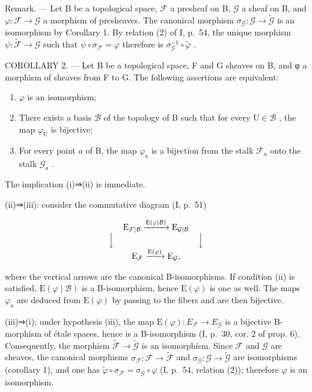 Remark. --- Let B be a topological space, \(\mathcal{F}\) a presheaf on B, \(\mathcal{G}\) a sheaf on B, and \(\varphi\colon\mathcal{F}\to\mathcal{G}\) a morphism of presheaves. The canonical morphism \(\sigma_{\mathcal{G}}\colon\mathcal{G}\to\widetilde{\mathcal{G}}\) is an isomorphism by Corollary 1. By relation (2) of I, p.~54, the unique morphism \(\psi\colon\widetilde{\mathcal{F}}\to\mathcal{G}\) such that \(\psi\circ\sigma_{\mathcal{F}}=\varphi\) therefore is \(\sigma_{\mathcal{G}}^{-1}\circ\widetilde{\varphi}\) .

COROLLARY 2. --- Let B be a topological space, F and G sheaves on B, and φ a morphism of sheaves from F to G. The following assertions are equivalent:

\begin{enumerate}
\def\labelenumi{(\roman{enumi})}
\item
  \(\varphi\) is an isomorphism;
\item
  There exists a basis \(\mathcal{B}\) of the topology of B such that for every \(\mathrm{U} \in \mathcal{B}\) , the map \(\varphi_{\mathrm{U}}\) is bijective;
\item
  For every point \(a\) of B, the map \(\varphi_{a}\) is a bijection from the stalk \(\mathcal{F}_{a}\) onto the stalk \(\mathcal{G}_{a}\) .
\end{enumerate}

The implication (i)⇒(ii) is immediate.

(ii)⇒(iii): consider the commutative diagram (I, p.~51)

\[
\begin{array}{c} \mathrm{E} _ {\mathcal {F} | \mathcal {B}} \xrightarrow {\mathrm{E} (\varphi | \mathcal {B})} \mathrm{E} _ {\mathcal {G} | \mathcal {B}} \\ \Big \downarrow \qquad \qquad \qquad \qquad \qquad \Big \downarrow \\ \mathrm{E} _ {\mathcal {F}} \xrightarrow {\mathrm{E} (\varphi)} \mathrm{E} _ {\mathcal {G}}, \end{array}
\]

where the vertical arrows are the canonical B-isomorphisms. If condition (ii) is satisfied, \(\mathrm{E}(\varphi \mid \mathcal{B})\) is a B-isomorphism, hence \(\mathrm{E}(\varphi)\) is one as well. The maps \(\varphi_{a}\) are deduced from \(\mathrm{E}(\varphi)\) by passing to the fibers and are then bijective.

(iii)⇒(i): under hypothesis (iii), the map \(\mathrm{E}(\varphi)\colon E_{\mathcal{F}} \to E_{\mathcal{G}}\) is a bijective B-morphism of étale spaces, hence is a B-isomorphism (I, p.~30, cor. 2 of prop. 6). Consequently, the morphism \(\widetilde{\mathcal{F}}\to\widetilde{\mathcal{G}}\) is an isomorphism. Since \(\mathcal{F}\) and \(\mathcal{G}\) are sheaves, the canonical morphisms \(\sigma_{\mathcal{F}}\colon\mathcal{F}\to\widetilde{\mathcal{F}}\) and \(\sigma_{\mathcal{G}}\colon\mathcal{G}\to\widetilde{\mathcal{G}}\) are isomorphisms (corollary 1), and one has \(\widetilde{\varphi}\circ\sigma_{\mathcal{F}}=\sigma_{\mathcal{G}}\circ\varphi\) (I, p.~54, relation (2)); therefore \(\varphi\) is an isomorphism.

